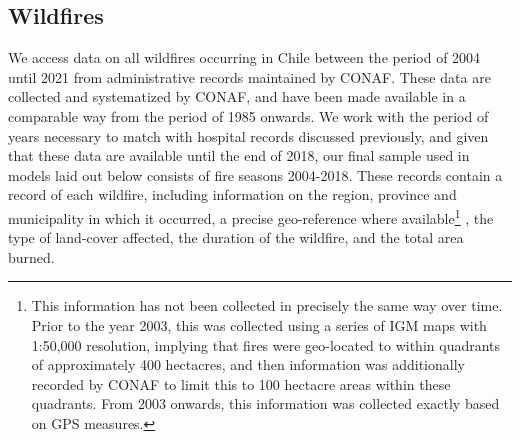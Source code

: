 \documentclass[11pt]{article}
\begin{document}
\begin{spacing}{1.3}
\subsection{Wildfires}
\label{sscn:fires} 
We access data on all wildfires occurring in Chile between the period of 2004 until 2021 from administrative records maintained by CONAF.  These data are collected and systematized by CONAF, and have been made available in a comparable way from the period of 1985 onwards. We work with the period of years necessary to match with hospital records discussed previously, and given that these data are available until the end of 2018, our final sample used in models laid out below consists of fire seasons 2004-2018.  These records contain a record of each wildfire, including information on the region, province and municipality in which it occurred, a precise geo-reference where available\footnote{This information has not been collected in precisely the same way over time.  Prior to the year 2003, this was collected using a series of IGM maps with 1:50,000 resolution, implying that fires were geo-located to within quadrants of approximately 400 hectacres, and then information was additionally recorded by CONAF to limit this to 100 hectacre areas within these quadrants.  From 2003 onwards, this information was collected exactly based on GPS measures.}%
, the type of land-cover affected, the duration of the wildfire, and the total area burned.  


\end{spacing}
\end{document}
